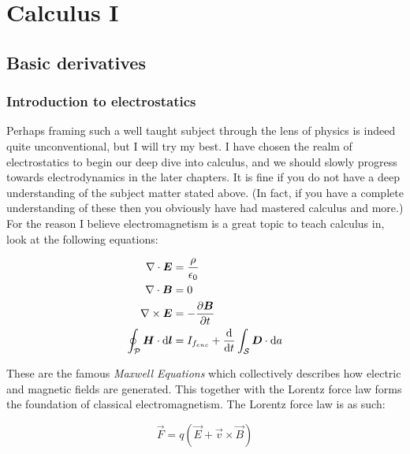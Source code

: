 \part{Calculus I}

\chapter{Basic derivatives}

\section{Introduction to electrostatics}


Perhaps framing such a well taught subject through the lens of physics is indeed quite unconventional, but I will try my best. I have chosen the realm of electrostatics to begin our deep dive into calculus, and we should slowly progress towards electrodynamics in the later chapters. It is fine if you do not have a deep understanding of the subject matter stated above. (In fact, if you have a complete understanding of these then you obviously have had mastered calculus and more.) For the reason I believe electromagnetism is a great topic to teach calculus in, look at the following equations:

\begin{align}
  \nabla \cdot \vec{E} &= \frac{\rho}{\epsilon_0} \\
  \nabla \cdot \vec{B} &= 0 \\
  \nabla \times \vec{E} &= -\pdv{\vec{B}}{t} \\
  \oint_{\mathcal{P}} \vec{H} \cdot \dd{\vec{l}} &= I_{f_{enc}} + \odv{}{t} \int_{\mathcal{S}} \vec{D} \cdot \dd{a}
\end{align}


These are the famous \emph{Maxwell Equations} which collectively describes how electric and magnetic fields are generated. This together with the Lorentz force law forms the foundation of classical electromagnetism. The Lorentz force law is as such:

\begin{equation}
  \vec{F} = q(\vec{E} + \vec{v}\times\vec{B}) \label{lorentzforce}
\end{equation}


